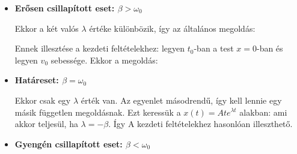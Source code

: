     \begin{itemize}
     \item {\bf Erősen csillapított eset: $\beta>\omega_0$}
     
     Ekkor a két valós $\lambda$ értéke különbözik, így az általános megoldás:
     
     Ennek illesztése a kezdeti feltételekhez: legyen $t_0$-ban a test $x=0$-ban és legyen $v_0$ sebessége. Ekkor a megoldás:
     \item {\bf Határeset: $\beta=\omega_0$}
      
      Ekkor csak egy $\lambda$ érték van. Az egyenlet másodrendű, így kell lennie egy másik független megoldásnak. Ezt keressük a $x(t)=Ate^{\lambda t}$ alakban:
      ami akkor teljesül, ha $\lambda=-\beta$. Így
      A kezdeti feltételekhez hasonlóan illeszthető.
      
     \item {\bf Gyengén csillapított eset: $\beta<\omega_0$}
      

\end{itemize}
